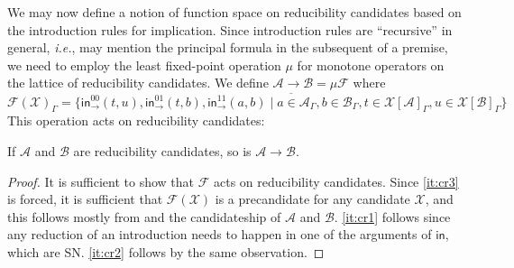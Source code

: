 \documentclass[a4paper,USenglish,cleveref, autoref, thm-restate]{lipics-v2019}
\newcommand{\ie}{\emph{i.e.}\xspace}
\newcommand{\tin}{\ensuremath{\mathsf{in}}}
\newcommand{\inn}[2]{\ensuremath{\tin_{#1}^{#2}}}
\newcommand{\red}[1][]{\longrightarrow_{#1}}
\newcommand{\cl}[1]{\overline{#1}}
\newcommand{\A}{\mathcal{A}}
\newcommand{\B}{\mathcal{B}}
\newcommand{\F}{\mathcal{F}}
\newcommand{\X}{\mathcal{X}}
\newcommand{\Up}{\mathop{\Uparrow}}
\begin{document}

We may now define a notion of function space on reducibility
candidates based on the introduction rules for implication.  Since
introduction rules are ``recursive'' in general, \ie, may mention the
principal formula in the subsequent of a premise, we need to employ
the least fixed-point operation $\mu$ for monotone operators on the
lattice of reducibility candidates.
We define $\A \to \B = \mu\F$ where
\[
  \F(\X)_\Gamma =
  \cl{\{
    \inn\to{00}(t,u),
    \inn\to{01}(t,b),
    \inn\to{11}(a,b) \mid
      a \in \A_\Gamma,
      b \in \B_\Gamma,
      t \in \X[\A]_\Gamma,
      u \in \X[\B]_\Gamma
  \}}
\]
This operation acts on reducibility candidates:
\begin{lemma}
  \label{lem:fun}
  If $\A$ and $\B$ are reducibility candidates, so is $\A \to \B$.
\end{lemma}
\begin{proof}
  It is sufficient to show that $\F$ acts on reducibility candidates.
  Since \ref{it:cr3} is forced, it is sufficient that $\F(\X)$ is a
  precandidate for any candidate $\X$, and this follows mostly from
   and the candidateship of $\A$ and $\B$.
  \ref{it:cr1} follows since any reduction of an introduction
  needs to happen in one of the arguments of $\tin$, which are SN.
  \ref{it:cr2} follows by the same observation.
\end{proof}
\end{document}
